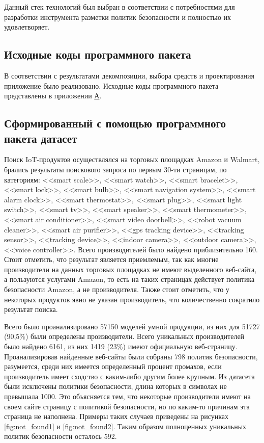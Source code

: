 \documentclass[../main]{subfiles}
\begin{document}
Данный стек технологий был выбран в соответствии с потребностями для разработки инструмента разметки политик безопасности и полностью их удовлетворяет.

\subsection{Исходные коды программного пакета}
В соответствии с результатами декомпозиции, выбора средств и проектирования приложение было реализовано. Исходные коды программного пакета представлены в приложении \hyperref[sec:appendix1]{А}.

\subsection{Сформированный с помощью программного пакета датасет}
Поиск IoT-продуктов осуществлялся на торговых площадках Amazon и Walmart, брались результаты поискового запроса по первым 30-ти страницам, по категориям: <<smart scale>>, <<smart watch>>, <<smart bracelet>>, <<smart lock>>, <<smart bulb>>, <<smart navigation system>>, <<smart alarm clock>>, <<smart thermostat>>, <<smart plug>>, <<smart light switch>>, <<smart tv>>, <<smart speaker>>, <<smart thermometer>>, <<smart air conditioner>>, <<smart video doorbell>>, <<robot vacuum cleaner>>, <<smart air pu\-ri\-fi\-er>>, <<gps tracking device>>, <<tracking sensor>>, <<tracking device>>, <<indoor came\-ra>>, <<outdoor camera>>, <<voice controller>>. Всего производителей было найдено приблизительно 160. Стоит отметить, что результат является приемлемым, так как многие производители на данных торговых площадках не имеют выделенного веб-сайта, а пользуются услугами Amazon, то есть на таких страницах действует политика безопасности Amazon, а не производителя. Также стоит отметить, что у некоторых продуктов явно не указан производитель, что количественно сократило результат поиска.

Всего было проанализировано 57150 моделей умной продукции, из них для 51727 (90,5\%) были определены производители. Всего уникальных производителей было найдено 6161, из них 1419 (23\%) имеют официальную веб-страницу. Проанализировав найденные веб-сайты были собраны 798 политик безопасности, разумеется, среди них имеется определенный процент промахов, если производитель имеет сходство с каким-либо другим более крупным. Из датасета были исключены политики безопасности, длина которых в символах не превышала 1000. Это объясняется тем, что некоторые производители имеют на своем сайте страницу с политикой безопасности, но по каким-то причинам эта страница не наполнена. Примеры таких случаев приведены на рисунках \ref{fig:not_found1} и \ref{fig:not_found2}. Таким образом полноценных уникальных политик безопасности осталось 592.
\end{document}
